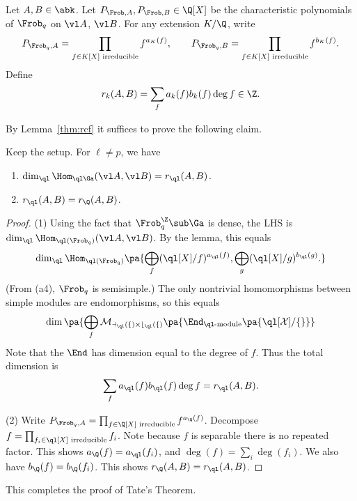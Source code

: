 \begin{df}
Let $A,B\in \abk$. Let $P_{\Frob,A},P_{\Frob,B}\in \Q[X]$ be the characteristic polynomials of $\Frob_q$  on $\vl A$, $\vl B$. For any extension $K/\Q$, write
\[
P_{\Frob_q,A}=\prod_{f\in K[X]\text{ irreducible}} f^{a_K(f)},\qquad P_{\Frob_q,B} =\prod_{f\in K[X]\text{ irreducible}} f^{b_K(f)}.
\]
Define
\[
r_k(A,B)=\sum_f a_k(f)b_k(f)\deg f\in \Z.
\]
\end{df}
By Lemma~\ref{thm:rcf} it suffices to prove the following claim.
\begin{clm}
Keep the setup. For $\ell\ne p$, we have
\begin{enumerate}
\item%
$\dim_{\ql}\Hom_{\ql \Ga}(\vl A, \vl B)=r_{\ql}(A,B)$.
\item
$r_{\ql}(A,B)=r_{\Q}(A,B)$.
\end{enumerate}
\end{clm}
\begin{proof}
(1) Using the fact that $\Frob_q^{\Z}\sub \Ga$ is dense, the LHS is $\dim_{\ql} \Hom_{\ql(\Frob_q)} (\vl A, \vl B)$.  By the lemma, this equals
\[\dim_{\ql}\Hom_{\ql(\Frob_q)} \pa{
\bigoplus_f (\ql[X]/f)^{a_{\ql}(f)}, \bigoplus_g (\ql[X]/g)^{b_{\ql}(g)}.
}\]
(From (a4), $\Frob_q$ is semisimple.) %
The only nontrivial homomorphisms between simple modules are endomorphisms, so this equals 
\[
\dim\pa{\bigoplus_f  \cal M_{a_{\ql}(f)\times b_{\ql}(f)} \pa{
\End_{\ql\text{-module}}\pa{\ql[X]/f}
}}
\]
Note that the $\End$ has dimension equal to the degree of $f$. Thus the total dimension is
\[
\sum_f a_{\ql}(f)b_{\ql}(f) \deg f=r_{\ql}(A,B).
\]

(2) Write $P_{\Frob_q,A}=\prod_{f\in \Q[X]\text{ irreducible}}f^{a_{\Q}(f)}$. 
Decompose $f=\prod_{f_i\in \ql[X]\text{ irreducible}} f_i$. Note because $f$ is separable there is no repeated factor. This shows $a_{\Q}(f)=a_{\ql}(f_i)$, and $\deg(f)=\sum_i \deg(f_i)$. We also have $b_{\Q}(f)=b_{\Q}(f_i)$. This shows $r_{\Q}(A,B)=r_{\ql}(A,B)$.
\end{proof}
This completes the proof of Tate's Theorem.
